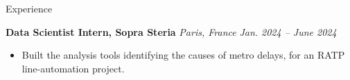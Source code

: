 \documentclass{resume} %
\begin{document}
\begin{rSection}{Experience}
\begin{itemize}
\end{itemize}

{\bf Data Scientist Intern, Sopra Steria} \raisebox{0.2ex}{\scriptsize \textbullet} {\em  \hspace{1em} Paris, France} \hfill {\em Jan. 2024 -- June 2024} 
\begin{itemize}
    \item Built the analysis tools identifying the causes of metro delays, for an RATP line-automation project.

\end{itemize}


\end{rSection}


\end{document}
